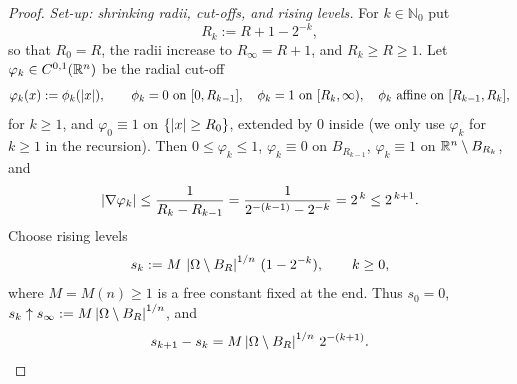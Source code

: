 \begin{proof}
\smallskip
\emph{Set-up: shrinking radii, cut-offs, and rising levels.}
For $k\in\mathbb N_0$ put
\[
   R_k:=R+1-2^{-k},
\]
so that $R_0=R$, the radii increase to $R_\infty=R+1$, and
$R_k\ge R\ge1$.
Let $\varphi_k\in C^{0,1}(\mathbb R^n)$ be the radial cut-off
\[
   \varphi_k(x):=\phi_k(\left|x\right|),\qquad
   \phi_k=0\ \text{on}\ [0,R_{k-1}],\quad
   \phi_k=1\ \text{on}\ [R_k,\infty),\quad
   \phi_k\ \text{affine on}\ [R_{k-1},R_k],
\]
for $k\ge1$, and $\varphi_0\equiv1$ on $\{\left|x\right|\ge R_0\}$, extended by
$0$ inside (we only use $\varphi_k$ for $k\ge1$ in the recursion). Then
$0\le\varphi_k\le1$, $\varphi_k\equiv0$ on $B_{R_{k-1}}$, $\varphi_k\equiv1$
on $\mathbb R^n\setminus B_{R_k}$, and
\[
   \left|\nabla\varphi_k\right|\le\frac1{R_k-R_{k-1}}
   =\frac1{2^{-(k-1)}-2^{-k}}=2^{\,k}\le 2^{\,k+1}.
\]
Choose rising levels
\[
   s_k:=M\,\left|\Omega\setminus B_R\right|^{1/n}\,(1-2^{-k}),\qquad k\ge0,
\]
where $M=M(n)\ge1$ is a free constant fixed at the end. Thus $s_0=0$,
$s_k\uparrow s_\infty:=M\left|\Omega\setminus B_R\right|^{1/n}$, and
\begin{equation}\label{eq:s-diff}
   s_{k+1}-s_k=M\left|\Omega\setminus B_R\right|^{1/n}\,2^{-(k+1)} .
\end{equation}


\end{proof}
